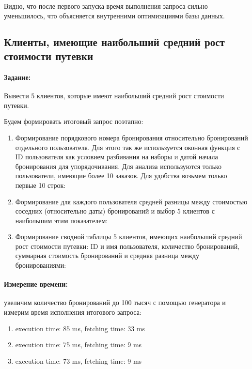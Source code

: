 Видно, что после первого запуска время выполнения запроса сильно уменьшилось, что объясняется внутренними оптимизациями базы данных.

\subsection{Клиенты, имеющие наибольший средний рост стоимости путевки}

\paragraph{Задание:} Вывести 5 клиентов, которые имеют наибольший средний рост стоимости путевки.

Будем формировать итоговый запрос поэтапно:
\begin{enumerate}[leftmargin=0em]
	\item Формирование порядкового номера бронирования относительно бронирований отдельного пользователя. Для этого так же используется оконная функция  с ID пользователя как условием разбивания на наборы и датой начала бронирования для упорядочивания. Для анализа используются только пользователи, имеющие более 10 заказов. Для удобства возьмем только первые 10 строк:
	
	\item Формирование для каждого пользователя средней разницы между стоимостью соседних (относительно даты) бронирований и выбор 5 клиентов с наибольшим этим показателем: 
	
	\item Формирование сводной таблицы 5 клиентов, имеющих наибольший средний рост стоимости путевки: ID и имя пользователя, количество бронирований, суммарная стоимость бронирований и средняя разница между бронированиями:
\end{enumerate}

\paragraph{Измерение времени:} увеличим количество бронирований до 100 тысяч с помощью генератора и измерим время исполнения итогового запроса:

\begin{enumerate}
	\item execution time: 85 ms, fetching time: 33 ms
	\item execution time: 75 ms, fetching time: 9 ms
	\item execution time: 73 ms, fetching time: 9 ms
\end{enumerate}

